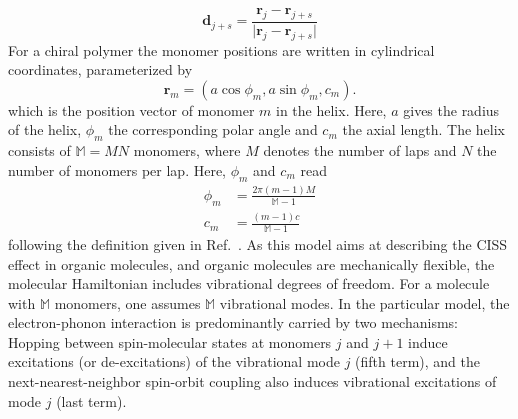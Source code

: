 \documentclass{article}
\renewcommand{\vec}[1]{\mathbf{#1}}
\begin{document}
\begin{equation}
	\vec{d}_{j+s} = \frac{\vec{r}_j-\vec{r}_{j+s}}{\vert\vec{r}_j-\vec{r}_{j+s} \vert}
\end{equation}
For a chiral polymer the monomer positions are written in cylindrical coordinates, parameterized by
\begin{equation}
	\vec{r}_m = (a\cos \phi_m, a\sin\phi_m,c_m).
\end{equation}
which is the position vector of monomer $m$ in the helix. Here, $a$ gives the radius of the helix, $\phi_m$ the corresponding polar angle and $c_m$ the axial length. The helix consists of $\mathbb{M}=MN$ monomers, where $M$ denotes the number of laps and $N$ the number of monomers per lap.
Here, $\phi_m$ and $c_m$ read
\begin{align}
	\phi_m &=  \frac{2\pi(m-1)M}{\mathbb{M}-1}\\
	c_m &= \frac{(m-1)c}{\mathbb{M}-1}
\end{align}
following the definition given in Ref.~\cite{fransson2020vibrational}.
As this model aims at describing the CISS effect in organic molecules, and organic molecules are mechanically flexible, the molecular Hamiltonian includes vibrational degrees of freedom. 
For a molecule with $\mathbb{M}$ monomers, one assumes $\mathbb{M}$ vibrational modes. In the particular model, the electron-phonon interaction is predominantly carried by two mechanisms: Hopping between spin-molecular states at monomers $j$ and $j+1$ induce excitations (or de-excitations) of the vibrational mode $j$ (fifth term), and the next-nearest-neighbor spin-orbit coupling also induces vibrational excitations of mode $j$ (last term).
\end{document}
